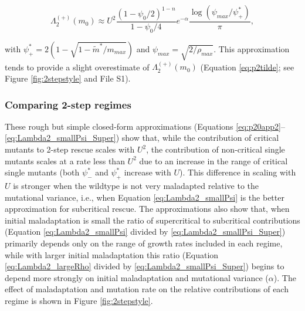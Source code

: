 \documentclass[9pt,twocolumn,twoside,lineno]{gsajnl}
\begin{document}
\begin{equation}\label{eq:Lambda2_smallPsi_Super}
\Lambda_2^{(+)}(m_0) \approx U^2 \frac{(1-\psi_0/2)^{1-n}}{1-\psi_0/4} e^{-\alpha} \frac{\log(\psi_{max} / \psi^*_{+})}{\pi},
\end{equation}

\noindent with $\psi^*_{+} = 2(1-\sqrt{1 - \tilde{m}^*/m_{max}})$ and $\psi_{max} = \sqrt{2/\rho_{max}}$.
This approximation tends to provide a slight overestimate of $\Lambda_2^{(+)}(m_0)$ (Equation \ref{eq:p2tilde}; see Figure \ref{fig:2stepstyle} and File S1).

\subsubsection{Comparing 2-step regimes}

These rough but simple closed-form approximations (Equations \ref{eq:p20app2}--\ref{eq:Lambda2_smallPsi_Super}) show that, while the contribution of critical mutants to 2-step rescue scales with $U^2$, the contribution of non-critical single mutants scales at a rate less than $U^2$ due to an increase in the range of critical single mutants (both $\psi^*_-$ and $\psi^*_+$ increase with $U$).
This difference in scaling with $U$ is stronger when the wildtype is not very maladapted relative to the mutational variance, i.e., when Equation \ref{eq:Lambda2_smallPsi} is the better approximation for subcritical rescue.
The approximations also show that, when initial maladaptation is small the ratio of supercritical to subcritical contributions (Equation \ref{eq:Lambda2_smallPsi} divided by \ref{eq:Lambda2_smallPsi_Super}) primarily depends only on the range of growth rates included in each regime, while with larger initial maladaptation this ratio (Equation \ref{eq:Lambda2_largeRho} divided by \ref{eq:Lambda2_smallPsi_Super}) begins to depend more strongly on initial maladaptation and mutational variance ($\alpha$).
The effect of maladaptation and mutation rate on the relative contributions of each regime is shown in Figure \ref{fig:2stepstyle}.
\end{document}
